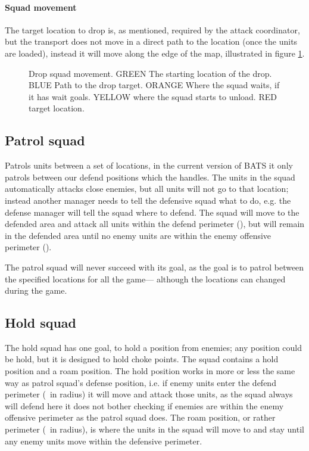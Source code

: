 
\paragraph{Squad movement}
The target location to drop is, as mentioned, required by the attack coordinator, but the transport does not move in a direct path to the location (once the units are loaded), instead it will move along the edge of the map, illustrated in figure \ref{fig:drop_squad_movement}.
\begin{figure}[htb]
\caption[Drop squad movement]{Drop squad movement. GREEN The starting location of the drop. BLUE Path to the drop target. ORANGE Where the squad waits, if it has wait goals. YELLOW where the squad starts to unload. RED target location.}
\label{fig:drop_squad_movement}
\end{figure}

\subsection{Patrol squad}
\label{sec:patrol_squad}
Patrols units between a set of locations, in the current version of BATS it only patrols between our defend positions which the  handles. The units in the squad automatically attacks close enemies, but all units will not go to that location; instead another manager needs to tell the defensive squad what to do, e.g. the defense manager will tell the squad where to defend. The squad will move to the defended area and attack all units within the defend perimeter (\squadDefendDefendPerimeter), but will remain in the defended area until no enemy units are within the enemy offensive perimeter (\squadDefendEnemyOffensivePerimeter).

The patrol squad will never succeed with its goal, as the goal is to patrol between the specified locations for all the game— although the locations can changed during the game.


\subsection{Hold squad}
\label{sec:hold_squad}
The hold squad has one goal, to hold a position from enemies; any position could be hold, but it is designed to hold choke points. The squad contains a hold position and a roam position. The hold position works in more or less the same way as patrol squad's defense position, i.e. if enemy units enter the defend perimeter (\squadDefendDefendPerimeter~in radius) it will move and attack those units, as the squad always will defend here it does not bother checking if enemies are within the enemy offensive perimeter as the patrol squad does. The roam position, or rather perimeter (\squadDefendRoamPerimeter~in radius), is where the units in the squad will move to and stay until any enemy units move within the defensive perimeter.

